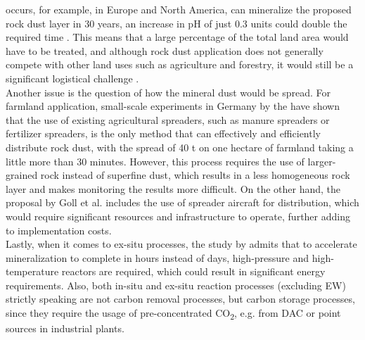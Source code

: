 occurs, for example, in Europe and North America, can mineralize the proposed rock dust layer in 30 years, an increase in pH of just 0.3 units could double the required time \parencite{Schuiling2006EnhancedCo2}. This means that a large percentage of the total land area would have to be treated, and although rock dust application does not generally compete with other land uses such as agriculture and forestry, it would still be a significant logistical challenge \parencite{Dipple2021TheSystems}.\\Another issue is the question of how the mineral dust would be spread. For farmland application, small-scale experiments in Germany by the \textcite{CarbonDrawdownInitiative2022HowExperiments} have shown that the use of existing agricultural spreaders, such as manure spreaders or fertilizer spreaders, is the only method that can effectively and efficiently distribute rock dust, with the spread of 40 t on one hectare of farmland taking a little more than 30 minutes. However, this process requires the use of larger-grained rock instead of superfine dust, which results in a less homogeneous rock layer and makes monitoring the results more difficult. On the other hand, the proposal by Goll et al. includes the use of spreader aircraft for distribution, which would require significant resources and infrastructure to operate, further adding to implementation costs.\\Lastly, when it comes to ex-situ processes, the study by \textcite{Lackner1997ProgressSubstrates} admits that to accelerate mineralization to complete in hours instead of days, high-pressure and high-temperature reactors are required, which could result in significant energy requirements. Also, both in-situ and ex-situ reaction processes (excluding EW) strictly speaking are not carbon removal processes, but carbon storage processes, since they require the usage of pre-concentrated CO\textsubscript{2}, e.g. from DAC or point sources in industrial plants.
